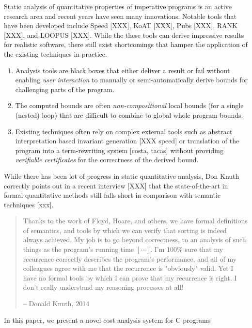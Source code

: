 \documentclass[nocopyrightspace,preprint]{sigplanconf}
\begin{document}
Static analysis of quantitative properties of imperative programs is
an active research area and recent years have seen many innovations.
Notable tools that have been developed include Speed [XXX], KoAT
[XXX], Pubs [XXX], RANK [XXX], and LOOPUS [XXX].
%
While the these tools can derive impressive results for realistic
software, there still exist shortcomings that hamper the application
of the existing techniques in practice.
\begin{enumerate}
\item Analysis tools are black boxes that either deliver a result or fail
  without enabling \emph{user interaction} to manually or
  semi-automatically derive bounds for challenging parts of the
  program.
\item The computed bounds are often \emph{non-compositional} local
  bounds (for a single (nested) loop) that are difficult to combine to
  global whole program bounds.
\item Existing techniques often rely on complex external tools such as
  abstract interpretation based invariant generation [XXX speed] or
  translation of the program into a term-rewriting system [costa,
  tacas] without providing \emph{verifiable certificates} for the
  correctness of the derived bound.
\end{enumerate}
%
While there has been lot of progress in static quantitative analysis,
Don Knuth correctly points out in a recent interview [XXX] that the
state-of-the-art in formal quantitative methods still falls short
in comparison with semantic techniques [xxx].
%
\begin{quote}
  Thanks to the work of Floyd, Hoare, and others,
  we have formal definitions of semantics, and tools by which we can
  verify that sorting is indeed always achieved. My job is to go
  beyond correctness, to an analysis of such things as the program's
  running time $[\cdots]$. I'm 100\% sure that my recurrence correctly
  describes the program's performance, and all of my colleagues agree
  with me that the recurrence is "obviously" valid. Yet I have no
  formal tools by which I can prove that my recurrence is right. I
  don't really understand my reasoning processes at all!
  \vspace{-3ex}
  \begin{flushright}
    -- Donald Knuth, 2014
  \end{flushright}
\end{quote}
%
%
In this paper, we present a novel cost analysis system for C programs
\end{document}
